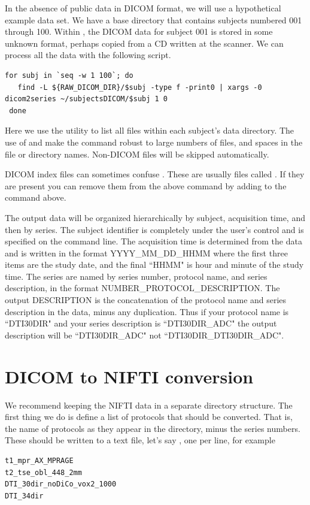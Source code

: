 \documentclass{InsightArticle}
\begin{document}
In the absence of public data in DICOM format, we will use a hypothetical example data set. We have a base directory  that contains subjects numbered 001 through 100. Within , the DICOM data for subject 001 is stored in some unknown format, perhaps copied from a CD written at the scanner. We can process all the data with the following script.
\begin{lstlisting}[style=bash]
 for subj in `seq -w 1 100`; do
   find -L ${RAW_DICOM_DIR}/$subj -type f -print0 | xargs -0 dicom2series ~/subjectsDICOM/$subj 1 0 
 done
\end{lstlisting}
Here we use the  utility to list all files within each subject's data directory. The use of  and  make the command robust to large numbers of files, and spaces in the file or directory names. Non-DICOM files will be skipped automatically. 

DICOM index files can sometimes confuse . These are usually files called . If they are present you can remove them from the above command by adding  to the  command above.

The output data will be organized hierarchically by subject, acquisition time, and then by series. The subject identifier is completely under the user's control and is specified on the command line. The acquisition time is determined from the data and is written in the format YYYY\_MM\_DD\_HHMM where the first three items are the study date, and the final ``HHMM" is hour and minute of the study time. The series are named by series number, protocol name, and series description, in the format NUMBER\_PROTOCOL\_DESCRIPTION. The output DESCRIPTION is the concatenation of the protocol name and series description in the data, minus any duplication. Thus if your protocol name is ``DTI30DIR" and your series description is ``DTI30DIR\_ADC" the output description will be ``DTI30DIR\_ADC" not ``DTI30DIR\_DTI30DIR\_ADC".


\section{DICOM to NIFTI conversion} \label{sec:dicom2nii}

We recommend keeping the NIFTI data in a separate directory structure. The first thing we do is define a list of protocols that should be converted. That is, the name of protocols as they appear in the  directory, minus the series numbers. These should be written to a text file, let's say , one per line, for example
\begin{lstlisting}[style=bash]
t1_mpr_AX_MPRAGE
t2_tse_obl_448_2mm
DTI_30dir_noDiCo_vox2_1000
DTI_34dir
\end{lstlisting}
\end{document}
